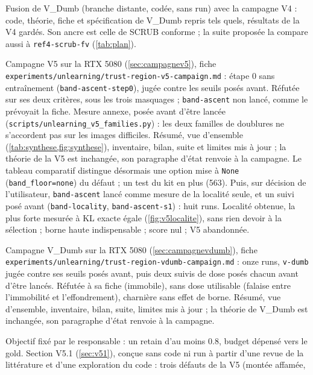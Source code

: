 \documentclass[11pt,a4paper]{article}
\newcommand{\code}[1]{\texttt{#1}}
\newcommand{\chemin}[1]{\nolinkurl{#1}}%
\begin{document}
\begin{description}[leftmargin=1.2em,font=\sffamily\bfseries\color{bleu}]
  \item[22 novembre 2026, cinquième fusion] Fusion de V\_Dumb (branche distante, codée, sans run)
    avec la campagne V4 : code, théorie, fiche et spécification de V\_Dumb repris tels quels,
    résultats de la V4 gardés. Son ancre est celle de SCRUB conforme ; la suite proposée la compare
    aussi à \code{ref4-scrub-fv} (\cref{tab:plan}).
  \item[22 novembre 2026, campagne V5] Campagne V5 sur la RTX 5080 (\cref{sec:campagnev5}), fiche
    \chemin{experiments/unlearning/trust-region-v5-campaign.md} : étape 0 sans entraînement
    (\code{band-ascent-step0}), jugée contre les seuils posés avant. Réfutée sur ses deux critères,
    sous les trois masquages ; \code{band-ascent} non lancé, comme le prévoyait la fiche. Mesure
    annexe, posée avant d'être lancée (\chemin{scripts/unlearning_v5_families.py}) : les deux familles
    de doublures ne s'accordent pas sur les images difficiles. Résumé, vue d'ensemble
    (\cref{tab:synthese,fig:synthese}), inventaire, bilan, suite et limites mis à jour ; la théorie de
    la V5 est inchangée, son paragraphe d'état renvoie à la campagne. Le tableau comparatif distingue
    désormais une option mise à \code{None} (\code{band\_floor=none}) du défaut ; un test du kit en
    plus (563). Puis, sur décision de l'utilisateur, \code{band-ascent} lancé comme mesure de la
    localité seule, et un suivi posé avant (\code{band-locality}, \code{band-ascent-s1}) : huit runs.
    Localité obtenue, la plus forte mesurée à KL exacte égale (\cref{fig:v5localite}), sans rien
    devoir à la sélection ; borne haute indispensable ; score nul ; V5 abandonnée.
  \item[22 novembre 2026, campagne V\_Dumb] Campagne V\_Dumb sur la RTX 5080
    (\cref{sec:campagnevdumb}), fiche \chemin{experiments/unlearning/trust-region-vdumb-campaign.md} :
    onze runs, \code{v-dumb} jugée contre ses seuils posés avant, puis deux suivis de dose posés chacun
    avant d'être lancés. Réfutée à sa fiche (immobile), sans dose utilisable (falaise entre
    l'immobilité et l'effondrement), charnière sans effet de borne. Résumé, vue d'ensemble,
    inventaire, bilan, suite, limites mis à jour ; la théorie de V\_Dumb est inchangée, son paragraphe
    d'état renvoie à la campagne.
  \item[22 novembre 2026, V5.1] Objectif fixé par le responsable : un retain d'au moins \num{0.8},
    budget dépensé vers le gold. Section V5.1 (\cref{sec:v51}), conçue sans code ni run à partir d'une
    revue de la littérature et d'une exploration du code : trois défauts de la V5 (montée affamée,

\end{description}
\end{document}
